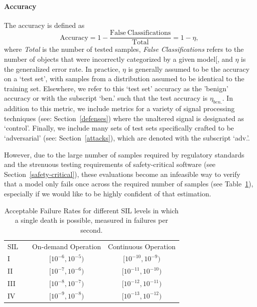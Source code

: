 \documentclass[journal]{IEEEtran}
\begin{document}
\paragraph{Accuracy}

The accuracy is defined as
\begin{equation}\label{eq:accuracy} 
    \mathrm{Accuracy}
    = 1 - \frac{\mathrm{False~Classifications}}{\mathrm{Total}}
    = 1 - \eta,
\end{equation}
where \textit{Total} is the number of tested samples, \textit{False Classifications} refers to the number of objects that were incorrectly categorized by a given model[, and $\eta$ is the generalized error rate. In practice, $\eta$ is generally assumed to be the accuracy on a `test set', with samples from a distribution assumed to be identical to the training set. Elsewhere, we refer to this `test set' accuracy as the 'benign' accuracy or with the subscript `ben.' such that the test accuracy is $\eta_{ben.}$. In addition to this metric, we include metrics for a variety of signal processing techniques (see: Section~\ref{defenses}) where the unaltered signal is designated as `control'. Finally, we include many sets of test sets specifically crafted to be `adversarial' (see: Section~\ref{attacks}), which are denoted with the subscript `adv.'.

However, due to the large number of samples required by regulatory standards  and the strenuous testing requirements of safety-critical software (see Section~\ref{safety-critical}), these evaluations become an infeasible way to verify that a model only fails once across the required number of samples (see Table~\ref{tab:rate}), especially if we would like to be highly confident of that estimation.

\begin{table}[!ht]
    \begin{center}
        \caption{Acceptable Failure Rates for different SIL levels in which a single death is possible, measured in failures per second.}
        \begin{tabular}{l c cc}
            \toprule
            SIL  && On-demand Operation   & Continuous Operation \\
            \cmidrule{1-1} \cmidrule{3-4}
            I     && $[10^{-6}, 10^{-5})$  & $[10^{-10}, 10^{-9})$ \\
            II    && $[10^{-7}, 10^{-6})$  & $[10^{-11}, 10^{-10})$ \\
            III   && $[10^{-8}, 10^{-7})$  & $[10^{-12}, 10^{-11})$ \\
            IV    && $[10^{-9}, 10^{-8})$  & $[10^{-13}, 10^{-12})$ \\
            \bottomrule
        \end{tabular}
        \label{tab:rate}
    \end{center}
\end{table} 
\end{document}
